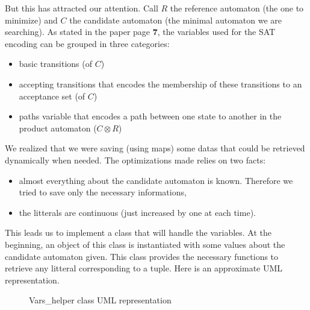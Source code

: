 But this has attracted our attention. Call $R$ the reference automaton (the one to minimize) and $C$
the candidate automaton (the minimal automaton we are searching). As stated in the
\cite{14} paper page \textbf{7}, the variables used for the SAT encoding can be grouped in three categories:

\begin{itemize}
 \item basic transitions (of $C$)
 \item accepting transitions that encodes the membership of these transitions to an acceptance set
       (of $C$)
 \item paths variable that encodes a path between one state to another in the product automaton
       ($C \otimes R$)
\end{itemize}

We realized that we were saving (using maps) some datas that could be retrieved dynamically when needed. The
optimizations made relies on two facts:
\begin{itemize}
 \item almost everything about the candidate automaton is known. Therefore we tried to save only the
       necessary informations,
 \item the litterals are continuous (just increased by one at each time).
\end{itemize}

\noindent This leads us to implement a class that will handle the variables. At the beginning, an object of
this class is instantiated with some values about the candidate automaton given. This class provides the
necessary functions to retrieve any litteral corresponding to a tuple. Here is an approximate UML
representation.\\

\begin{figure}[h]
  \centering
  \caption{Vars\_helper class UML representation}
  \label{fig:vars_helper_uml}
\end{figure}

